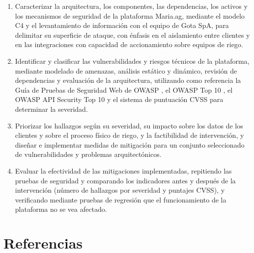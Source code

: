 \documentclass[12pt,letterpaper]{report}
\begin{document}
\begin{enumerate}[leftmargin=1.25cm]
    \item Caracterizar la arquitectura, los componentes, las dependencias, los activos y los mecanismos de seguridad de la plataforma Maria.ag, mediante el modelo C4 y el levantamiento de información con el equipo de Gota SpA, para delimitar su superficie de ataque, con énfasis en el aislamiento entre clientes y en las integraciones con capacidad de accionamiento sobre equipos de riego.
    \item Identificar y clasificar las vulnerabilidades y riesgos técnicos de la plataforma, mediante modelado de amenazas, análisis estático y dinámico, revisión de dependencias y evaluación de la arquitectura, utilizando como referencia la Guía de Pruebas de Seguridad Web de OWASP \autocite{owasp2024wstg}, el OWASP Top 10 \autocite{owasp2025top10}, el OWASP API Security Top 10 \autocite{owasp2023api} y el sistema de puntuación CVSS \autocite{first2023cvss} para determinar la severidad.
    \item Priorizar los hallazgos según su severidad, su impacto sobre los datos de los clientes y sobre el proceso físico de riego, y la factibilidad de intervención, y diseñar e implementar medidas de mitigación para un conjunto seleccionado de vulnerabilidades y problemas arquitectónicos.
    \item Evaluar la efectividad de las mitigaciones implementadas, repitiendo las pruebas de seguridad y comparando los indicadores antes y después de la intervención (número de hallazgos por severidad y puntajes CVSS), y verificando mediante pruebas de regresión que el funcionamiento de la plataforma no se vea afectado.
\end{enumerate}
\newpage

\chapter*{Referencias}

\vspace{0.5cm}

\printbibliography[heading=none]

\newpage
\end{document}
